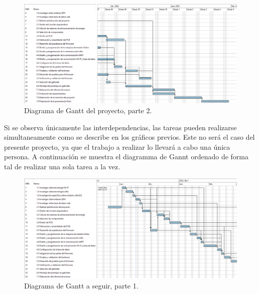 \documentclass[
11pt, %
codirector, %
]{charter}
\begin{document}
\begin{landscape}
\begin{figure}[htpb]
\centering 
\includegraphics[height=.7\textheight]{./Figuras/Diagrama Gantt 2.png}
\caption{Diagrama de Gantt del proyecto, parte 2.}
\label{fig:diagGantt2}
\end{figure}
\end{landscape}

\begin{landscape}
Si se observa únicamente las interdependencias, las tareas pueden realizarse simultaneamente como se describe en los gráficos previos. Este no será el caso del presente proyecto, ya que el trabajo a realizar lo llevará a cabo una única persona. A continuación se muestra el diagramma de Gannt ordenado de forma tal de realizar una sola tarea a la vez.

\begin{figure}[htpb]
\centering 
\includegraphics[height=.7\textheight]{./Figuras/Diagrama Gantt sin tareas en paralelo 1.png}
\caption{Diagrama de Gantt a seguir, parte 1.}
\label{fig:diagGantt3}
\end{figure}
\end{landscape}
\end{document}

